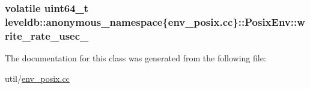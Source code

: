 \subsubsection[{write\+\_\+rate\+\_\+usec\+\_\+}]{\setlength{\rightskip}{0pt plus 5cm}volatile {\bf uint64\+\_\+t} leveldb\+::anonymous\+\_\+namespace\{env\+\_\+posix.\+cc\}\+::Posix\+Env\+::write\+\_\+rate\+\_\+usec\+\_\+\hspace{0.3cm}{\ttfamily [private]}}\label{classleveldb_1_1anonymous__namespace_02env__posix_8cc_03_1_1_posix_env_aaffb7d0312562394436495a29790bfcb}


The documentation for this class was generated from the following file\+:\begin{DoxyCompactItemize}
\item 
util/\hyperlink{env__posix_8cc}{env\+\_\+posix.\+cc}\end{DoxyCompactItemize}
